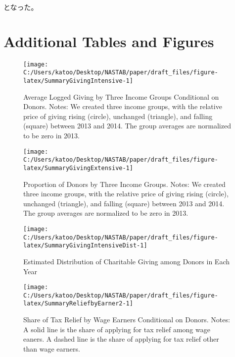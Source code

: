 \documentclass[
  11pt,
  a4paper,
]{article}
\begin{document}
となった。

\newpage

\hypertarget{appendix-appendix}{%
\appendix}


\hypertarget{addtab}{%
\section{Additional Tables and Figures}\label{addtab}}

\begin{figure}[H]

{\centering \texttt{[image: C:/Users/katoo/Desktop/NASTAB/paper/draft\_files/figure-latex/SummaryGivingIntensive-1]} 

}

\caption{Average Logged Giving by Three Income Groups Conditional on Donors. Notes: We created three income groups, with the relative price of giving rising (circle), unchanged (triangle), and falling (square) between 2013 and 2014. The group averages are normalized to be zero in 2013.}\label{fig:SummaryGivingIntensive}
\end{figure}

\begin{figure}[H]

{\centering \texttt{[image: C:/Users/katoo/Desktop/NASTAB/paper/draft\_files/figure-latex/SummaryGivingExtensive-1]} 

}

\caption{Proportion of Donors by Three Income Groups. Notes: We created three income groups, with the relative price of giving rising (circle), unchanged (triangle), and falling (square) between 2013 and 2014. The group averages are normalized to be zero in 2013.}\label{fig:SummaryGivingExtensive}
\end{figure}

\begin{figure}[H]

{\centering \texttt{[image: C:/Users/katoo/Desktop/NASTAB/paper/draft\_files/figure-latex/SummaryGivingIntensiveDist-1]} 

}

\caption{Estimated Distribution of Charitable Giving among Donors in Each Year}\label{fig:SummaryGivingIntensiveDist}
\end{figure}

\begin{figure}[H]

{\centering \texttt{[image: C:/Users/katoo/Desktop/NASTAB/paper/draft\_files/figure-latex/SummaryReliefbyEarner2-1]} 

}

\caption{Share of Tax Relief by Wage Earners Conditional on Donors. Notes: A solid line is the share of applying for tax relief among wage eaners. A dashed line is the share of applying for tax relief other than wage earners.}\label{fig:SummaryReliefbyEarner2}
\end{figure}
\end{document}

